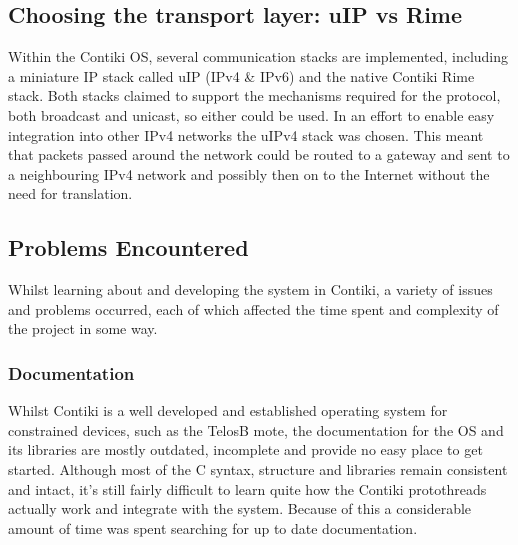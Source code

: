 
\subsection{Choosing the transport layer: uIP vs Rime} %
\label{sub:ip4_vs_ipv6_vs_rime}
Within the Contiki OS, several communication stacks are implemented, including a miniature IP stack called uIP (IPv4 \& IPv6) and the native Contiki Rime stack. Both stacks claimed to support the mechanisms required for the protocol, both broadcast and unicast, so either could be used. In an effort to enable easy integration into other IPv4 networks the uIPv4 stack was chosen. This meant that packets passed around the network could be routed to a gateway and sent to a neighbouring IPv4 network and possibly then on to the Internet without the need for translation. 

\subsection{Problems Encountered} %
\label{sub:problems_encountered}
Whilst learning about and developing the system in Contiki, a variety of issues and problems occurred, each of which affected the time spent and complexity of the project in some way.
\subsubsection{Documentation} %
\label{ssub:documentation}
Whilst Contiki is a well developed and established operating system for constrained devices, such as the TelosB mote, the documentation for the OS and its libraries are mostly outdated, incomplete and provide no easy place to get started. Although most of the C syntax, structure and libraries remain consistent and intact, it's still fairly difficult to learn quite how the Contiki protothreads actually work and integrate with the system. Because of this a considerable amount of time was spent searching for up to date documentation.

